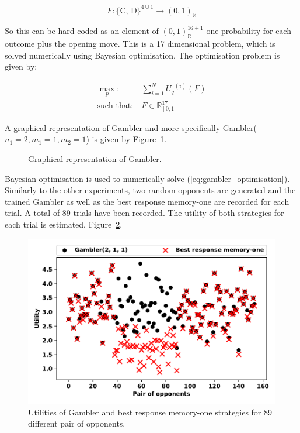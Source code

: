 \documentclass[10pt]{article}
\newcommand{\R}{\mathbb{R}}
\begin{document}
\begin{equation}\label{eq:gambler}
    F: \{\text{C, D}\}^{4 \cup 1} \rightarrow (0, 1)_{\R}
\end{equation}

So this can be hard coded as an element of \((0, 1)_{\R} ^ {16 + 1}\) one
probability for each outcome plus the opening move. This is a 17 dimensional
problem, which is solved numerically using Bayesian optimisation. The optimisation
problem is given by:

\begin{equation}\label{eq:gambler_optimisation}
    \begin{aligned}
    \max_p: & \ \sum_{i=1} ^ {N} {U_q}^{(i)} (F)
    \\
    \text{such that}: & \ F \in \R_{[0, 1]}^{17}
    \end{aligned}
\end{equation}

A graphical representation of Gambler and more specifically Gambler($n_1 = 2,
m_1 = 1, m_2 = 1$) is given by Figure~\ref{fig:gambler}.

\begin{figure}[!htbp]
    \centering
    
    \caption{Graphical representation of Gambler.}
    \label{fig:gambler}
\end{figure}

Bayesian optimisation is used to numerically solve
(\ref{eq:gambler_optimisation}). Similarly to the other experiments, two random
opponents are generated and the trained Gambler as well as the best response
memory-one are recorded for each trial. A total of 89 trials have been recorded.
The utility of both strategies for each trial is estimated,
Figure~\ref{fig:utilities_gambler_mem_one}.

\begin{figure}[!htbp]
    \centering
    \includegraphics[width=.55\textwidth]{img/gambler_performance_against_mem_one.pdf}
    \caption{Utilities of Gambler and best response memory-one strategies for
    89 different pair of opponents.}\label{fig:utilities_gambler_mem_one}
\end{figure}
\end{document}
